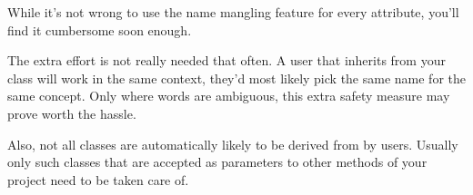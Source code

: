 
\begin{frame}
%
\begin{hintbox}
While it's not wrong to use the name mangling feature for every attribute, you'll find it cumbersome soon enough.

\vspace{3pt}
The extra effort is not really needed that often. A user that inherits from your class will work in the same context, \ie they'd most likely pick the same name for the same concept.
Only where words are ambiguous, this extra safety measure may prove worth the hassle.

\vspace{3pt}
Also, not all classes are automatically likely to be derived from by users.
Usually only such classes that are accepted as parameters to other methods of your project need to be taken care of.
\end{hintbox}
%
\end{frame}


